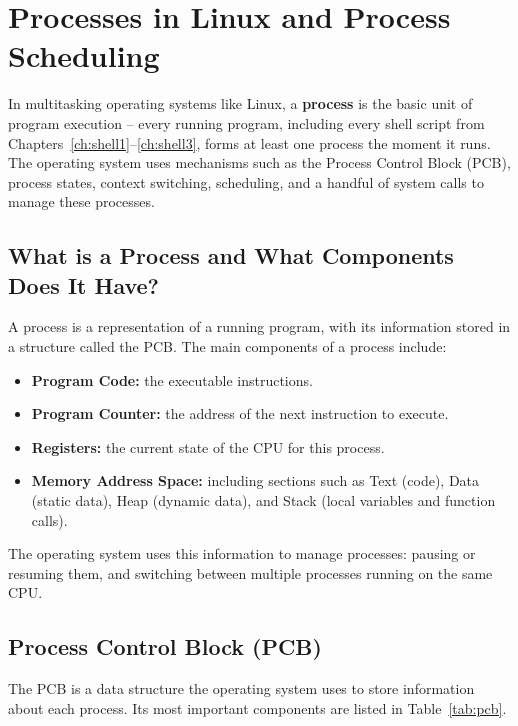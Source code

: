 
\chapter{Processes in Linux and Process Scheduling} %
\label{ch:processes} %

In multitasking operating systems like Linux, a \textbf{process} is the basic unit of program execution -- every running program, including every shell script from Chapters~\ref{ch:shell1}--\ref{ch:shell3}, forms at least one process the moment it runs. %
The operating system uses mechanisms such as the Process Control Block (PCB), process states, context switching, scheduling, and a handful of system calls to manage these processes. %

\section{What is a Process and What Components Does It Have?} %
A process is a representation of a running program, with its information stored in a structure called the PCB. %
The main components of a process include: %
\begin{itemize}
    \item \textbf{Program Code:} the executable instructions. %
    \item \textbf{Program Counter:} the address of the next instruction to execute. %
    \item \textbf{Registers:} the current state of the CPU for this process. %
    \item \textbf{Memory Address Space:} including sections such as Text (code), Data (static data), Heap (dynamic data), and Stack (local variables and function calls). %
\end{itemize}
The operating system uses this information to manage processes: pausing or resuming them, and switching between multiple processes running on the same CPU. %

\section{Process Control Block (PCB)} %
The PCB is a data structure the operating system uses to store information about each process. %
Its most important components are listed in Table~\ref{tab:pcb}. %

